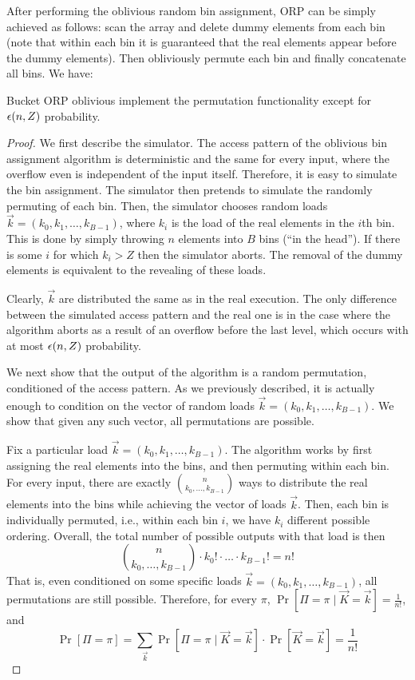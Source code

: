 After performing the oblivious random bin assignment, ORP can be simply achieved as follows:
scan the array and delete dummy elements from each bin (note that within each bin it is guaranteed that the real elements appear before the dummy elements). Then obliviously permute each bin and finally concatenate all bins.  We have:


\begin{lemma}
Bucket ORP oblivious implement the permutation functionality except for ${\epsilon}(n,Z)$ probability. 
\end{lemma}

\begin{proof}
We first describe the simulator. 
The access pattern of the oblivious bin assignment algorithm is deterministic and the same for every input, where the overflow even is independent of the input itself. Therefore, it is easy to simulate the bin assignment. 
The simulator then pretends to simulate the randomly permuting of each bin. 
Then, 
the simulator chooses random loads $\vec{k}=(k_0, k_1, \ldots, k_{B-1})$, where $k_i$ is the load of the real elements in the $i$th bin. This is done by simply throwing $n$ elements into $B$ bins (``in the head''). If there is some $i$ for which $k_i > Z$ then the simulator aborts. The removal of the dummy elements is equivalent to the revealing of these loads. 

Clearly, $\vec{k}$ are distributed the same as in the real execution. The only difference between the simulated access pattern and the real one is in the case where the algorithm aborts as a result of an overflow before the last level, which occurs with at most ${\epsilon}(n,Z)$ probability. 

We next show that the output of the algorithm is a random permutation, conditioned of the access pattern. As we previously described, it is actually enough to condition on the vector of random loads $\vec{k}=(k_0, k_1, \ldots, k_{B-1})$. We show that given any such vector, all permutations are possible.  

Fix a particular load $\vec{k}=(k_0, k_1, \ldots, k_{B-1})$. The algorithm works by first assigning the real elements into the bins, and then permuting within each bin. For every input, there are exactly ${n \choose k_0,\ldots,k_{B-1}}$ ways to distribute the real elements into the bins while achieving the vector of loads $\vec{k}$. Then, each bin is individually permuted, i.e., within each bin $i$, we have $k_i$ different possible ordering. Overall, 
the total number of possible outputs with that load is then
\[{n \choose k_0,\ldots,k_{B-1}} \cdot k_0! \cdot \ldots \cdot k_{B-1}! = n!\]
That is, even conditioned on some specific loads $\vec{k}=(k_0, k_1, \ldots, k_{B-1})$, all permutations are still possible.
Therefore, for every $\pi$, $\Pr\left[\Pi = \pi \mid \vec{K}=\vec{k} \right] = \frac 1 {n!}$, and
\[ \Pr\left[\Pi = \pi\right] = \sum_{\vec{k}} \Pr\left[\Pi = \pi \mid \vec{K}=\vec{k} \right] \cdot \Pr\left[\vec{K}=\vec{k}\right] = \frac {1}{n!} \]


\end{proof}
